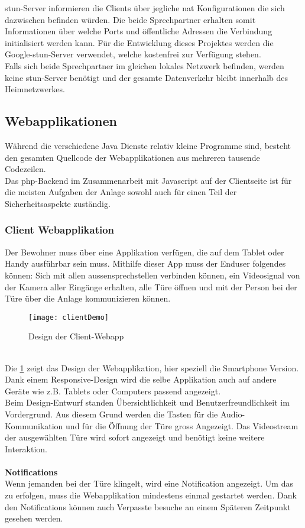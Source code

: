 \gls{stun}-Server informieren die Clients über jegliche \gls{nat} Konfigurationen die sich dazwischen befinden würden. Die beide Sprechpartner erhalten somit Informationen über welche Ports und öffentliche Adressen die Verbindung initialisiert werden kann. Für die Entwicklung dieses Projektes werden die Google-\gls{stun}-Server verwendet, welche kostenfrei zur Verfügung stehen.
\\
Falls sich beide Sprechpartner im gleichen lokales Netzwerk befinden, werden keine \gls{stun}-Server benötigt und der gesamte Datenverkehr bleibt innerhalb des Heimnetzwerkes.

\subsection{Webapplikationen}
\label{kap:webapp}
Während die verschiedene Java Dienste relativ kleine Programme sind, besteht den gesamten Quellcode der Webapplikationen aus mehreren tausende Codezeilen. 
\\
Das \gls{php}-Backend im Zusammenarbeit mit Javascript auf der Clientseite ist für die meisten Aufgaben der Anlage sowohl auch für einen Teil der Sicherheitsaspekte zuständig.

\subsubsection{Client Webapplikation}
Der Bewohner muss über eine Applikation verfügen, die auf dem Tablet oder Handy ausführbar sein muss. Mithilfe dieser App muss der Enduser folgendes können: Sich mit allen \gls{aussensprechstelle}n verbinden können, ein Videosignal von der Kamera aller Eingänge erhalten, alle Türe öffnen und mit der Person bei der Türe über die Anlage kommunizieren können.
\\
\begin{figure}[htb!]
	\begin{center}
		\texttt{[image: clientDemo]}
		\caption[Design der Client-Webapp]{Design der Client-Webapp}
		\label{fig:clientDemo}
	\end{center}
\end{figure}
\\
Die \cref{fig:clientDemo} zeigt das Design der Webapplikation, hier speziell die Smartphone Version. Dank einem Responsive-Design wird die selbe Applikation auch auf andere Geräte wie z.B. Tablets oder Computers passend angezeigt.
\\ 
Beim Design-Entwurf standen Übersichtlichkeit und Benutzerfreundlichkeit im Vordergrund. Aus diesem Grund werden die Tasten für die Audio-Kommunikation und für die Öffnung der Türe gross Angezeigt. Das Videostream der ausgewählten Türe wird sofort angezeigt und benötigt keine weitere Interaktion.
\\
\\
\textbf{Notifications}
\\
Wenn jemanden bei der Türe klingelt, wird eine Notification angezeigt. Um das zu erfolgen, muss die Webapplikation mindestens einmal gestartet werden. Dank den Notifications können auch Verpasste besuche an einem Späteren Zeitpunkt gesehen werden. 



